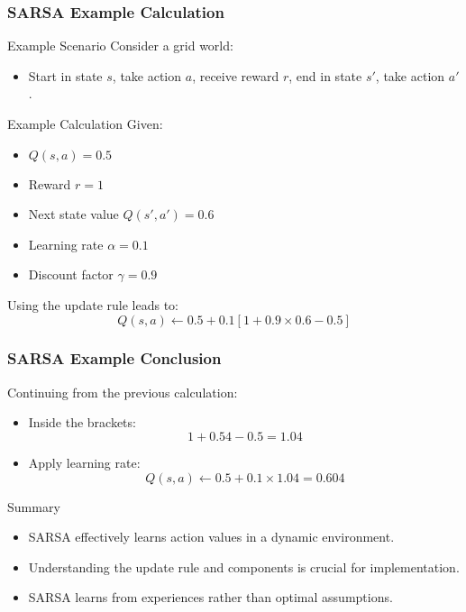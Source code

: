 \documentclass[aspectratio=169]{beamer}
\begin{document}
\begin{frame}[fragile]
    \frametitle{SARSA Example Calculation}
    \begin{block}{Example Scenario}
        Consider a grid world:
        \begin{itemize}
            \item Start in state \(s\), take action \(a\), receive reward \(r\), end in state \(s'\), take action \(a'\).
        \end{itemize}
    \end{block}
    
    \begin{block}{Example Calculation}
        Given:
        \begin{itemize}
            \item \(Q(s, a) = 0.5\)
            \item Reward \(r = 1\)
            \item Next state value \(Q(s', a') = 0.6\)
            \item Learning rate \(\alpha = 0.1\)
            \item Discount factor \(\gamma = 0.9\)
        \end{itemize}
        
        Using the update rule leads to:
        \begin{equation}
            Q(s, a) \leftarrow 0.5 + 0.1 \left[ 1 + 0.9 \times 0.6 - 0.5 \right]
        \end{equation}
    \end{block}
\end{frame}

\begin{frame}[fragile]
    \frametitle{SARSA Example Conclusion}
    Continuing from the previous calculation:
    \begin{itemize}
        \item Inside the brackets:
        \[
            1 + 0.54 - 0.5 = 1.04
        \]
        \item Apply learning rate:
        \[
            Q(s, a) \leftarrow 0.5 + 0.1 \times 1.04 = 0.604
        \]
    \end{itemize}
    
    \begin{block}{Summary}
        \begin{itemize}
            \item SARSA effectively learns action values in a dynamic environment.
            \item Understanding the update rule and components is crucial for implementation.
            \item SARSA learns from experiences rather than optimal assumptions.
        \end{itemize}
    \end{block}
\end{frame}
\end{document}
